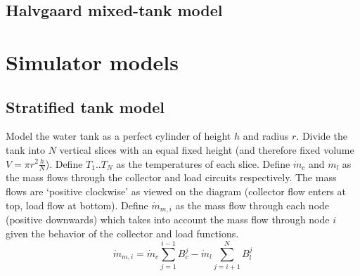 \subsection{Halvgaard mixed-tank model}
\label{sec:model:halvgaard}

\section{Simulator models}

\subsection{Stratified tank model}

Model the water tank as a perfect cylinder of height $h$ and radius $r$.
Divide the tank into $N$ vertical slices with an equal fixed height (and therefore fixed volume $V = \pi r^2 \frac{h}{N}$).
Define $T_1 .. T_N$ as the temperatures of each slice.
Define $\dot{m}_c$ and $\dot{m}_l$ as the mass flows through the collector and load circuits respectively.
The mass flows are `positive clockwise' as viewed on the diagram (collector flow enters at top, load flow at bottom).
Define $\dot{m}_{m, i}$ as the mass flow through each node (positive downwards) which takes into account the mass flow through node $i$ given the behavior of the collector and load functions.
$$ \dot{m}_{m, i} = \dot{m}_c \sum _{j=1} ^{i-1} B^j_c - \dot{m}_l \sum _{j=i+1} ^N B^j_l $$

